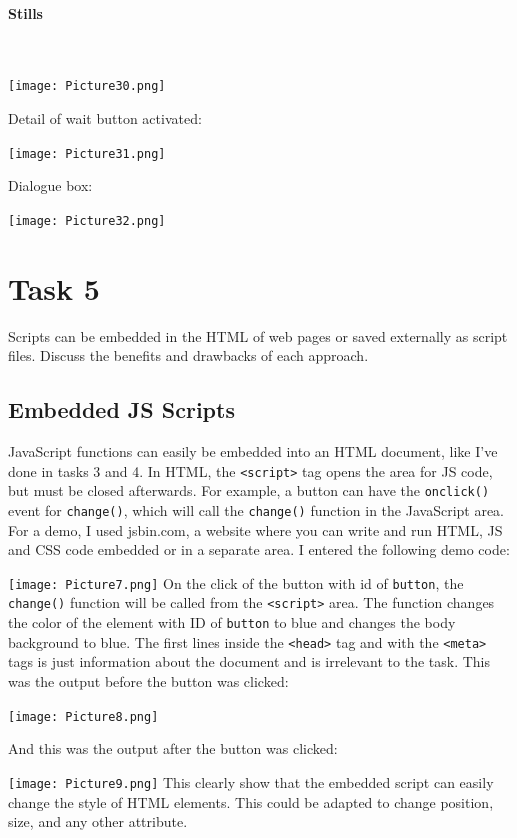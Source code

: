 \documentclass[a4paper]{article}
\begin{document}
\paragraph{Stills} ~\par
\noindent\texttt{[image: Picture30.png]} \par 
Detail of wait button activated: \par \par
\noindent\texttt{[image: Picture31.png]} \par 
Dialogue box: \par
\noindent\texttt{[image: Picture32.png]} \par 
\newpage
\section{Task 5}
Scripts can be embedded in the HTML of web pages or saved externally as script files. Discuss the benefits and drawbacks of each approach.
\subsection{Embedded JS Scripts}
JavaScript functions can easily be embedded into an HTML document, like I've done in tasks 3 and 4. In HTML, the \verb|<script>| tag opens the area for JS code, but must be closed afterwards. For example, a button can have the \verb|onclick()| event for \verb|change()|, which will call the \verb|change()| function in the JavaScript area. For a demo, I used jsbin.com, a website where you can write and run HTML, JS and CSS code embedded or in a separate area. I entered the following demo code: \par
\noindent\texttt{[image: Picture7.png]}
On the click of the button with id of \verb|button|, the \verb|change()| function will be called from the \verb|<script>| area. The function changes the color of the element with ID of \verb|button| to blue and changes the body background to blue. The first lines inside the \verb|<head>| tag and with the \verb|<meta>| tags is just information about the document and is irrelevant to the task. This was the output before the button was clicked: \par
\noindent\texttt{[image: Picture8.png]}\par \newpage
And this was the output after the button was clicked: \par
\noindent\texttt{[image: Picture9.png]}
This clearly show that the embedded script can easily change the style of HTML elements. This could be adapted to change position, size, and any other attribute. \newpage
\end{document}
